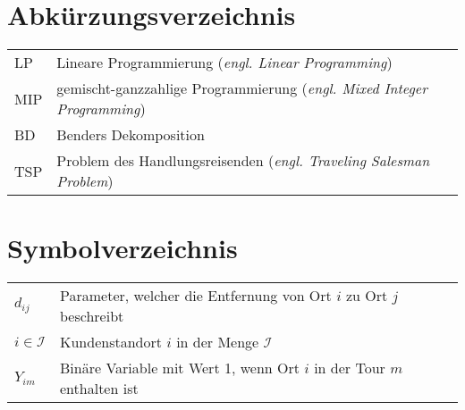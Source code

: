 \newpage

\tableofcontents

\newpage  %

\listoffigures

\listoftables

\listofalgorithms

\lstlistoflistings

\section*{Abkürzungsverzeichnis}
    \vspace*{-3mm}
    \begin{xltabular}{\linewidth}{lX}  
     LP	        & Lineare Programmierung (\textit{engl. Linear Programming})\\
     MIP		& gemischt-ganzzahlige Programmierung (\textit{engl. Mixed Integer Programming})\\
     BD		    & Benders Dekomposition\\
     TSP        & Problem des Handlungsreisenden (\textit{engl. Traveling Salesman Problem})\\
	\end{xltabular}

\newpage
\section*{Symbolverzeichnis}
\vspace*{-3mm}
\begin{xltabular}{\linewidth}{lX}  
    $d_{ij}$ & Parameter, welcher die Entfernung von Ort $i$ zu Ort $j$ beschreibt\\    
	$i \in \mathcal{I}$	& Kundenstandort $i$ in der Menge $\mathcal{I}$ \\
	$Y_{im}$ & Binäre Variable mit Wert 1, wenn Ort $i$ in der Tour $m$ enthalten ist\\
\end{xltabular}

\newpage